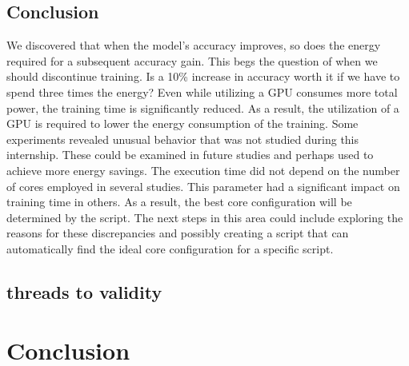 \subsection{Conclusion}
We discovered that when the model's accuracy improves, so does the energy required for a subsequent accuracy gain.
This begs the question of when we should discontinue training.
Is a 10\% increase in accuracy worth it if we have to spend three times the energy?
Even while utilizing a GPU consumes more total power, the training time is significantly reduced.
As a result, the utilization of a GPU is required to lower the energy consumption of the training.
Some experiments revealed unusual behavior that was not studied during this internship.
These could be examined in future studies and perhaps used to achieve more energy savings.
The execution time did not depend on the number of cores employed in several studies.
This parameter had a significant impact on training time in others.
As a result, the best core configuration will be determined by the script.
The next steps in this area could include exploring the reasons for these discrepancies and possibly creating a script that can automatically find the ideal core configuration for a specific script.



\subsection{threads to validity }
\section{Conclusion }